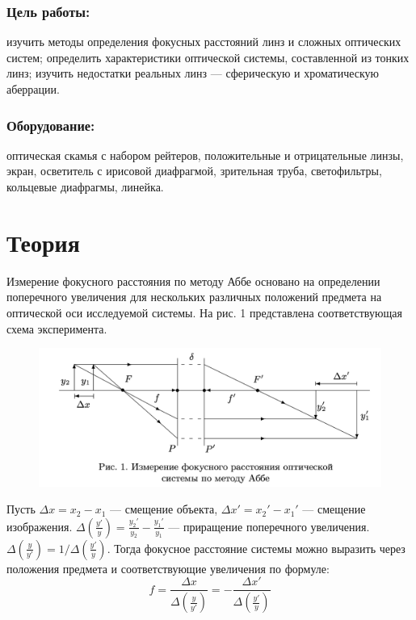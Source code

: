 \documentclass[a4paper,12pt]{article}
\begin{document}
\subsubsection*{Цель работы:} изучить методы определения фокусных расстояний линз и сложных оптических систем; определить характеристики оптической системы, составленной из тонких линз; изучить недостатки реальных линз — сферическую и хроматическую аберрации.

\subsubsection*{Оборудование:} оптическая скамья с набором рейтеров, положительные и отрицательные линзы, экран, осветитель с ирисовой диафрагмой, зрительная труба, светофильтры, кольцевые диафрагмы, линейка.

\section*{Теория}

Измерение фокусного расстояния по методу Аббе основано на определении поперечного увеличения для нескольких  различных положений предмета на оптической оси исследуемой системы. На рис. 1 представлена соответствующая схема эксперимента.
\begin{center}
	\begin{figure}[bhtp!]
		\centering
	\includegraphics[width=16cm]{1.1.1.png}
	\end{figure}
\end{center}
Пусть $\Delta x =x_2 - x_1$ --- смещение объекта,  $\Delta x' = x_2' - x_1'$ --- смещение изображения. $\Delta\left(\frac{y'}{y}\right) = \frac{y_2'}{y_2} - \frac{y_1'}{y_1}$ ---  приращение поперечного увеличения. $\Delta\left(\frac{y}{y'}\right) = 1/\Delta\left(\frac{y'}{y}\right)$.  Тогда 
фокусное расстояние системы можно выразить через положения предмета и соответствующие увеличения по формуле: \begin{equation}\label{formula1}
	f = \frac{\Delta x}{\Delta\left(\frac{y}{y'}\right)} = -\frac{\Delta x'}{\Delta\left(\frac{y'}{y}\right)}
\end{equation}
\end{document}
